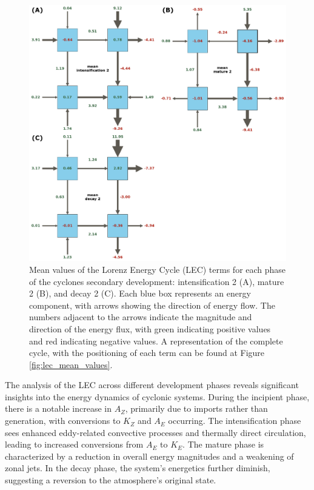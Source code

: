 \begin{figure}[!htbp]
\centering
\includegraphics[width=\textwidth]{figs_5/lec_mean_values_phases_second.pdf}
\caption[LEC - Mean Life Cycle for Each Phase]{Mean values of the Lorenz Energy Cycle (LEC) terms for each phase of the cyclones secondary development: intensification 2 (A), mature 2 (B), and decay 2 (C). Each blue box represents an energy component, with arrows showing the direction of energy flow. The numbers adjacent to the arrows indicate the magnitude and direction of the energy flux, with green indicating positive values and red indicating negative values. A representation of the complete cycle, with the positioning of each term can be found at Figure \ref{fig:lec_mean_values}.}
\label{fig:lec_mean_values_phases_second}
\end{figure}

The analysis of the LEC across different development phases reveals significant insights into the energy dynamics of cyclonic systems. During the incipient phase, there is a notable increase in $A_Z$, primarily due to imports rather than generation, with conversions to $K_Z$ and $A_E$ occurring. The intensification phase sees enhanced eddy-related convective processes and thermally direct circulation, leading to increased conversions from $A_E$ to $K_E$. The mature phase is characterized by a reduction in overall energy magnitudes and a weakening of zonal jets. In the decay phase, the system's energetics further diminish, suggesting a reversion to the atmosphere's original state.

